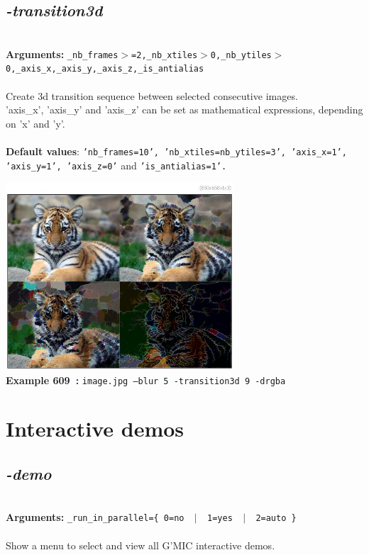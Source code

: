\documentclass[a4paper,11pt,twoside]{book}
\begin{document}
\subsection{\emph{-transition3d} }\vspace*{-0.5em}
~\\\textbf{Arguments: } 
{\small \texttt{\_nb\_frames$>$=2,\_nb\_xtiles$>$0,\_nb\_ytiles$>$0,\_axis\_x,\_axis\_y,\_axis\_z,\_is\_antialias}}\\~\\
Create 3d transition sequence between selected consecutive images.
~\\'axis\_x', 'axis\_y' and 'axis\_z' can be set as mathematical expressions, depending on 'x' and 'y'.
~\\~\\\textbf{Default values}: {\small \texttt{'nb\_frames=10', 'nb\_xtiles=nb\_ytiles=3', 'axis\_x=1', 'axis\_y=1', 'axis\_z=0'} and \texttt{'is\_antialias=1'.}}
\begin{center}\includegraphics[keepaspectratio=true,height=7cm,width=\textwidth]{img/gmic_def609.jpg}\\
{\footnotesize \textbf{Example 609~:} \texttt{image.jpg --blur 5 -transition3d 9 -drgba}}
\end{center}
\section{Interactive demos}


\subsection{\emph{-demo} }\vspace*{-0.5em}
~\\\textbf{Arguments: } 
{\small \texttt{\_run\_in\_parallel=\{ 0=no ~$|$~ 1=yes ~$|$~ 2=auto \}}}\\~\\
Show a menu to select and view all G'MIC interactive demos.
\end{document}
